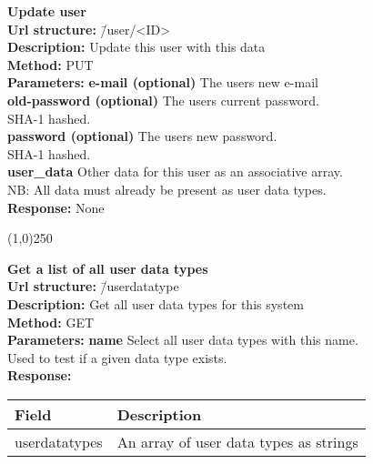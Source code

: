 \documentclass[11pt]{article}
\begin{document}
\begin{tabbing}
\textbf{Update user} \\
\textcolor{black!60}{\textbf{Url structure:}} \hspace{0.2in} \= /user/<ID> \\
\textcolor{black!60}{\textbf{Description:}}  \> Update this user with this data \\
\textcolor{black!60}{\textbf{Method:}} \> PUT \\
\textcolor{black!60}{\textbf{Parameters:}} \> \textbf{e-mail (optional)} The users new e-mail \\
\> \textbf{old-password (optional)} The users current password. \\ \> SHA-1 hashed. \\
\> \textbf{password (optional)} The users new password. \\ \> SHA-1 hashed. \\
\> \textbf{user\_data} Other data for this user as an associative array. \\
\> NB: All data must already be present as user data types. \\
\textcolor{black!60}{\textbf{Response:}} \> None
\end{tabbing}

\begin{center}\line(1,0){250}\end{center}

\begin{tabbing}
\textbf{Get a list of all user data types} \\
\textcolor{black!60}{\textbf{Url structure:}} \hspace{0.2in} \= /userdatatype \\
\textcolor{black!60}{\textbf{Description:}}  \> Get all user data types for this system \\
\textcolor{black!60}{\textbf{Method:}} \> GET \\
\textcolor{black!60}{\textbf{Parameters:}} \> \textbf{name} Select all user data types with this name. \\ \>
Used to test if a given data type exists. \\
\textcolor{black!60}{\textbf{Response:}} \\ \>
\begin{tabular}{|l|l|}
\hline
 Field          &  Description                             \\
\hline
 userdatatypes  &  An array of user data types as strings  \\
\hline
\end{tabular}
\end{tabbing}
\end{document}
